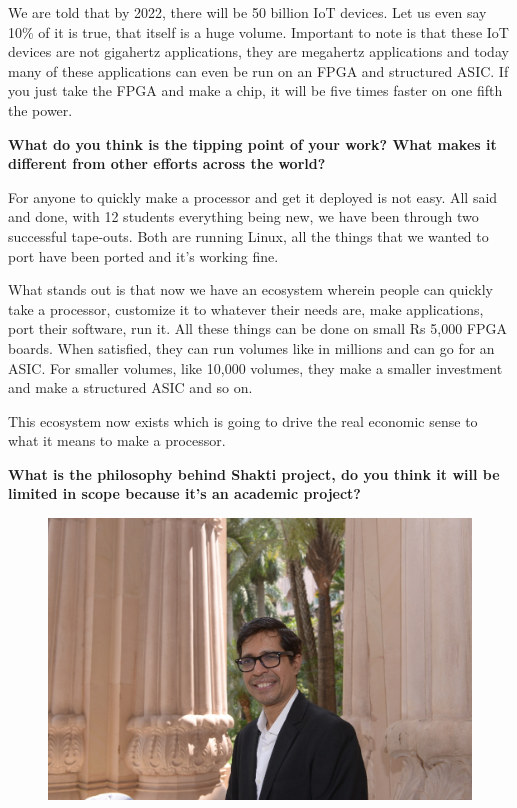 \begin{multicols}{2}
We are told that by 2022, there will be 50 billion IoT devices. Let us even say 10\% of it is true, that itself is a huge volume. Important to note is that these IoT devices are not gigahertz applications, they are megahertz applications and today many of these applications can even be run on an FPGA and structured ASIC. If you just take the FPGA and make a chip, it will be five times faster on one fifth the power.
\vskip -0.1cm

{\bf What do you think is the tipping point of your work? What makes it different from other efforts across the world?}
\vskip -0.1cm

For anyone to quickly make a processor and get it deployed is not easy. All said and done, with 12 students everything being new, we have been through two successful tape-outs. Both are running Linux, all the things that we wanted to port have been ported and it's working fine.

What stands out is that now we have an ecosystem wherein people can quickly take a processor, customize it to whatever their needs are, make applications, port their software, run it. All these things can be done on small Rs 5,000 FPGA boards. When satisfied, they can run volumes like in millions and can go for an ASIC. For smaller volumes, like 10,000 volumes, they make a smaller investment and make a structured ASIC and so on. 

This ecosystem now exists which is going to drive the real economic sense to what it means to make a processor.

{\bf What is the philosophy behind Shakti project, do you think it will be limited in scope because it's an academic project?}

\begin{figure}[H]
\centering
\includegraphics{src/Figures/authors/Kamakoti1.jpg}
\end{figure}
\vskip -0.6cm


\end{multicols}
